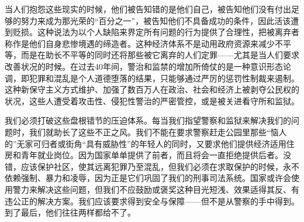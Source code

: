 \documentclass[fontset=fandol, a4paper, 12pt, openright]{ctexbook}
\begin{document}
当人们抱怨这些现实的时候，他们被告知错的是他们自己，被告知他们没有付出足够的努力来成为那光荣的“百分之一”，被告知他们不具备成功的条件，因此活该遭到贬损。这种说法为以个人缺陷来界定所有问题的行为提供了合理性，把被离弃者称作是他们自身悲惨境遇的缔造者。这种经济体系不是动用政府资源来减少不平等，而是在助长不平等的同时还将那些被它离弃的人们定罪——尤其是当人们要求改善状况的时候。在过去40年间，警治和监禁的增加所倚仗的是一种意识形态论调，即犯罪和混乱是个人道德堕落的结果，只能够通过严厉的惩罚性制裁来遏制。这种新保守主义方式维护、加强了数百万人在政治、社会和经济上被剥夺公民权的状况，这些人遭受着攻击性、侵犯性警治的严密管控，或是被关进看守所和监狱。

我们必须打破这些盘根错节的压迫体系。每当我们指望警察和监狱来解决我们的问题时，我们就助长了这些不正之风。我们不能在要求警察赶走公园里那些“恼人的”无家可归者或街角“具有威胁性”的年轻人的同时，又要求他们提供经济适用住房和青年就业岗位。因为国家单单提供了前者，而且将会一直拒绝提供后者。没错，应该保护社区，使其远离犯罪乃至混乱，但我们必须在求取保护的时候，永不依赖强制、暴力和凌辱，因为正是它们巩固了我们的刑事司法系统。国家或许会使用警力来解决这些问题，但我们不应鼓励或褒奖这种目光短浅、效果适得其反、有违公正的解决方案。我们应该要求得到安全与保障——但不是从警察的手中得到。到了最后，他们往往两样都给不了。
\end{document}
